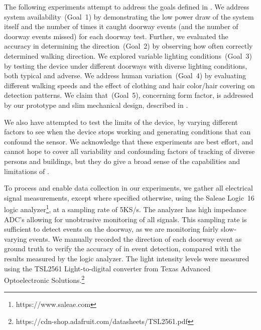 The following experiments attempt to address the goals defined in .
We address system availability~(Goal~1) by demonstrating the low power draw of the system itself and the number of times it caught doorway events (and the number of doorway events missed) for each doorway test.
Further, we evaluated the accuracy in determining the direction~(Goal~2) by observing how often \sysname correctly determined walking direction.
We explored variable lighting conditions~(Goal~3) by testing the device under \numDoors different doorways with diverse lighting conditions, both typical and adverse.
We address human variation~(Goal~4) by evaluating different walking speeds and the effect of clothing and hair color/hair covering on detection patterns.
We claim that~(Goal~5), concerning form factor, is addressed by our prototype and slim mechanical design, described in .

We also have attempted to test the limits of the device, by varying different factors to see when the device stops working and generating conditions that can confound the sensor.
We acknowledge that these experiments are best effort, and cannot hope to cover all variability and confounding factors of tracking of diverse persons and buildings, but they do give a broad sense of the capabilities and limitations of \sysname.

To process and enable data collection in our experiments, we gather all electrical signal measurements, except where specified otherwise, using the Saleae Logic~16 logic analyzer\footnote{https://www.saleae.com}, at a sampling rate of 5KS/s.
The analyzer has high impedance ADC's allowing for unobtrusive monitoring of all signals.
This sampling rate is sufficient to detect events on the doorway, as we are monitoring fairly slow-varying events.
We manually recorded the direction of each doorway event as ground truth to verify the accuracy of \sysname in event detection, compared with the results measured by the logic analyzer.
The light intensity levels were measured using the TSL2561 Light-to-digital converter from Texas Advanced Optoelectronic Solutions.\footnote{https://cdn-shop.adafruit.com/datasheets/TSL2561.pdf}


